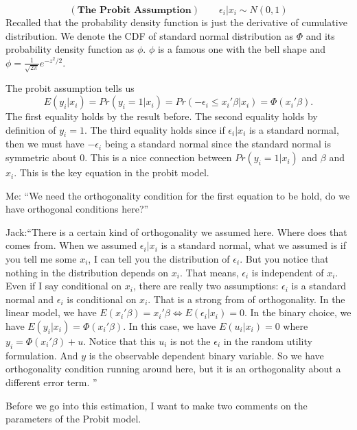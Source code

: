 \documentclass[11pt,a4paper]{amsart}
\theoremstyle{plain}
\theoremstyle{definition}
\begin{document}
	\[ (\textbf{The Probit Assumption})	 \qquad \epsilon_{i} | x_{i} \sim N(0,1)	\]
	 Recalled that the probability density function is just the derivative of cumulative distribution. We denote the CDF of standard normal distribution as $\Phi$ and its probability density function as $\phi$.  $\phi$ is a famous one with the bell shape and $\phi = \frac{1}{\sqrt{2\pi}}e^{-z^{2}/2}$.\par 
	 The probit assumption tells us 
	 \[	E(y_{i}|x_{i}) = Pr(y_{i} = 1 | x_{i}) = Pr(-\epsilon_{i} \leq x_{i}' \beta | x_{i}) = \Phi(x_{i}'\beta).	\]
	The first equality holds by the result before. The second equality holds by definition of $y_{i} = 1$. The third equality holds since if $\epsilon_{i} | x_{i}$ is a standard normal, then we must have $-\epsilon_{i}$ being a standard normal since the standard normal is symmetric about 0. This is a nice connection between $ Pr(y_{i} = 1 | x_{i}) $ and $\beta$ and $x_{i}$. This is the key equation in the probit model. \par 
	Me: ``We need the orthogonality condition for the first equation to be hold, do we have orthogonal conditions here?''\par 
	Jack:``There is a certain kind of orthogonality we assumed here. Where does that comes from. When we assumed $\epsilon_{i}|x_{i}$ is a standard normal, what we assumed is if you tell me some $x_{i}$, I can tell you the distribution of $\epsilon_{i}$. But you notice that nothing in the distribution depends on $x_{i}$. That means, $\epsilon_{i}$ is independent of $x_{i}$. Even if I say conditional on $x_{i}$, there are really two assumptions: $\epsilon_{i}$ is a standard normal and $\epsilon_{i}$ is conditional on $x_{i}$. That is a strong from of orthogonality. In the linear model, we have $E(x_{i}' \beta) = x_{i}' \beta \Leftrightarrow E(\epsilon_{i}|x_{i}) = 0$. In the binary choice, we have $E(y_{i}|x_{i}) = \Phi (x_{i}' \beta)$. In this case, we have $E(u_{i} | x_{i}) = 0$ where $y_{i} = \Phi(x_{i}' \beta) + u$. Notice that this $u_{i}$ is not the $\epsilon_{i}$ in the random utility formulation. And $y$ is the observable dependent binary variable. So we have orthogonality condition running around here, but it is an orthogonality about a different error term. ''\par 
	Before we go into this estimation, I want to make two comments on the parameters of the Probit model.\par 
\end{document}
